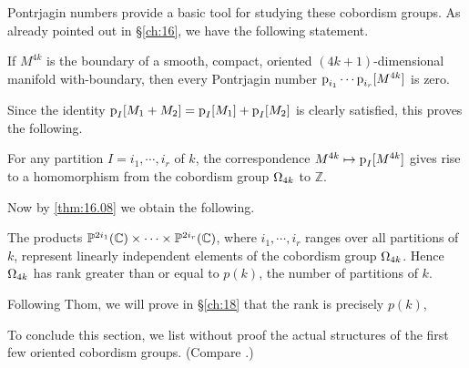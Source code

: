 \documentclass[../main]{subfiles}
\begin{document}
Pontrjagin numbers provide a basic tool for studying these cobordism groups. As already pointed out in \S\ref{ch:16}, we have the following statement.
\begin{lemma}[Pontrjagin]
\label{lem:17.03}
If $M^{4k}$ is the boundary of a smooth, compact, oriented $(4k+1)$-dimensional manifold with-boundary, then every Pontrjagin number $\operatorname{p}_{i_1} \cdots \operatorname{p}_{i_r}[M^{4k}]$ is zero.
\end{lemma}
Since the identity $\operatorname{p}_I[M_1 + M_2] = \operatorname{p}_I[M_1] + \operatorname{p}_I[M_2]$ is clearly satisfied, this proves the following.
\begin{corollary}
\label{cor:17.04}
For any partition $I = i_1,\cdots, i_r$ of $k$, the correspondence $M^{4k} \mapsto \operatorname{p}_I[M^{4k}]$ gives rise to a homomorphism from the cobordism group $\Omega_{4k}$ to $\mathbb{Z}$.
\end{corollary}

Now by \ref{thm:16.08} we obtain the following.

\begin{corollary}
\label{cor:17.05}
The products $\mathbb{P}^{2i_1}(\mathbb C) \times \cdots \times \mathbb{P}^{2i_r}(\mathbb C)$, where $i_1,\cdots,i_r$ ranges over all partitions of $k$, represent linearly independent elements of the cobordism group $\Omega_{4k}$. Hence $\Omega_{4k}$ has rank greater than or equal to $p(k)$, the number of partitions of $k$.
\end{corollary}
Following Thom, we will prove in \S\ref{ch:18} that the rank is precisely $p(k)$,

To conclude this section, we list without proof the actual structures of the first few oriented cobordism groups. (Compare \cite[p. 309]{wall}.)
\allowdisplaybreaks
\end{document}
